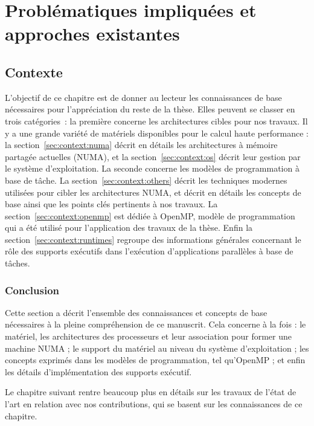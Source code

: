 \part{Problématiques impliquées et approches existantes}

\chapter{Contexte}\label{chap:contexte}
\chaptertoc

\pagebreak

L'objectif de ce chapitre est de donner au lecteur les connaissances de base nécessaires pour l'appréciation du reste de la thèse.
Elles peuvent se classer en trois catégories~: la première concerne les architectures cibles pour nos travaux. Il y a une grande variété de matériels disponibles pour le calcul haute performance : la section~\ref{sec:context:numa} décrit en détails les architectures à mémoire partagée actuelles (NUMA), et la section~\ref{sec:context:os} décrit leur gestion par le système d'exploitation.
La seconde concerne les modèles de programmation à base de tâche. La section~\ref{sec:context:others} décrit les techniques modernes utilisées pour cibler les architectures NUMA, et décrit en détails les concepts de base ainsi que les points clés pertinents à nos travaux. La section~\ref{sec:context:openmp} est dédiée à OpenMP, modèle de programmation qui a été utilisé pour l'application des travaux de la thèse.
Enfin la section~\ref{sec:context:runtimes} regroupe des informations générales concernant le rôle des supports exécutifs dans l'exécution d'applications parallèles à base de tâches.







\section*{Conclusion}

Cette section a décrit l'ensemble des connaissances et concepts de base nécessaires à la pleine compréhension de ce manuscrit.
Cela concerne à la fois : le matériel, les architectures des processeurs et leur association pour former une machine NUMA ; le support du matériel au niveau du système d'exploitation ; les concepts exprimés dans les modèles de programmation, tel qu'OpenMP ; et enfin les détails d'implémentation des supports exécutif.

Le chapitre suivant rentre beaucoup plus en détails sur les travaux de l'état de l'art en relation avec nos contributions, qui se basent sur les connaissances de ce chapitre.
